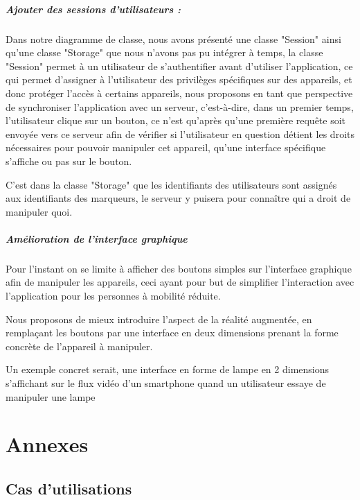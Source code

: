 \documentclass[12pt,a4paper]{article}
\begin{document}
\subparagraph{Ajouter des sessions d'utilisateurs :}
Dans notre diagramme de classe, nous avons présenté une classe "Session" ainsi qu'une classe "Storage" que nous n'avons pas pu intégrer à temps, la classe "Session" permet à un utilisateur de s’authentifier avant d'utiliser l'application, ce qui permet d'assigner à l'utilisateur des privilèges spécifiques sur des appareils, et donc protéger l'accès à certains appareils, nous proposons en tant que perspective de synchroniser l'application avec un serveur, c'est-à-dire, dans un premier temps, l'utilisateur clique sur un bouton, ce n'est qu'après qu'une première requête soit envoyée vers ce serveur afin de vérifier si l'utilisateur en question détient les droits nécessaires pour pouvoir manipuler cet appareil, qu'une interface spécifique s'affiche ou pas sur le bouton.\par
C'est dans la classe "Storage" que les identifiants des utilisateurs sont assignés aux identifiants des marqueurs, le serveur y puisera pour connaître qui a droit de manipuler quoi.
\subparagraph{Amélioration de l'interface graphique}
Pour l'instant on se limite à afficher des boutons simples sur l'interface graphique afin de manipuler les appareils, ceci ayant pour but de simplifier l'interaction avec l'application pour les personnes à mobilité réduite.\par
Nous proposons de mieux introduire l'aspect de la réalité augmentée, en remplaçant les boutons par une interface en deux dimensions prenant la forme concrète de l'appareil à manipuler.\par
Un exemple concret serait, une interface en forme de lampe en 2 dimensions s'affichant sur le flux vidéo d'un smartphone quand un utilisateur essaye de manipuler une lampe

\newpage

\section{Annexes}
\subsection{Cas d'utilisations}
\end{document}
